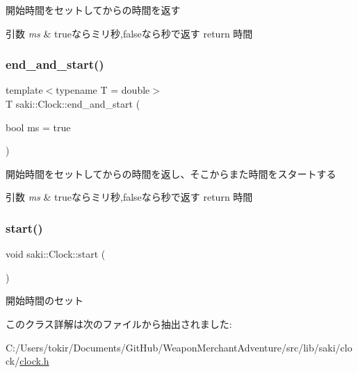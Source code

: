 開始時間をセットしてからの時間を返す 


\begin{DoxyParams}{引数}
{\em ms} & trueならミリ秒,falseなら秒で返す return 時間 \\
\hline
\end{DoxyParams}
\mbox{\label{classsaki_1_1_clock_a6df6705089065ac8f9f3cdb718d7284f}} 
\subsubsection{\texorpdfstring{end\+\_\+and\+\_\+start()}{end\_and\_start()}}
{\footnotesize\ttfamily template$<$typename T  = double$>$ \\
T saki\+::\+Clock\+::end\+\_\+and\+\_\+start (\begin{DoxyParamCaption}\item[{bool}]{ms = {\ttfamily true} }\end{DoxyParamCaption})\hspace{0.3cm}{\ttfamily [inline]}}



開始時間をセットしてからの時間を返し、そこからまた時間をスタートする 


\begin{DoxyParams}{引数}
{\em ms} & trueならミリ秒,falseなら秒で返す return 時間 \\
\hline
\end{DoxyParams}
\mbox{\label{classsaki_1_1_clock_a522e7d5dcae1f457dfc1cd4eb9560cec}} 
\subsubsection{\texorpdfstring{start()}{start()}}
{\footnotesize\ttfamily void saki\+::\+Clock\+::start (\begin{DoxyParamCaption}{ }\end{DoxyParamCaption})\hspace{0.3cm}{\ttfamily [inline]}}



開始時間のセット 



このクラス詳解は次のファイルから抽出されました\+:\begin{DoxyCompactItemize}
\item 
C\+:/\+Users/tokir/\+Documents/\+Git\+Hub/\+Weapon\+Merchant\+Adventure/src/lib/saki/clock/\mbox{\hyperlink{clock_8h}{clock.\+h}}\end{DoxyCompactItemize}
